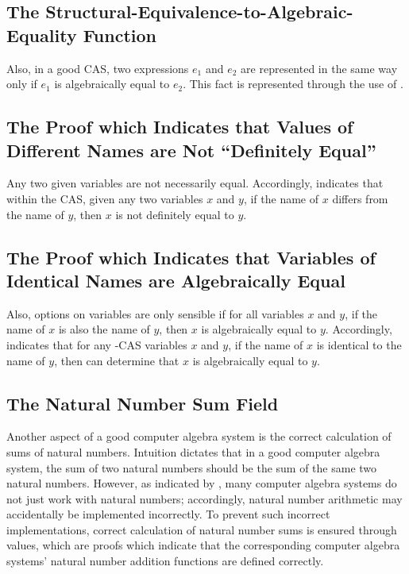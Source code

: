 \documentclass{report}
\begin{document}
\subsection{The Structural-Equivalence-to-Algebraic-Equality Function}
Also, in a good CAS, two expressions \(e_1\) and \(e_2\) are represented in the same way only if \(e_1\) is algebraically equal to \(e_2\).  This fact is represented through the use of .

\subsection{The Proof which Indicates that Values of Different Names are Not ``Definitely Equal''}
Any two given variables are not necessarily equal.  Accordingly,   indicates that within the  CAS, given any two  variables \(x\) and \(y\), if the name of \(x\) differs from the name of \(y\), then \(x\) is not definitely equal to \(y\).

\subsection{The Proof which Indicates that Variables of Identical Names are Algebraically Equal}
Also, options on variables are only sensible if for all variables \(x\) and \(y\), if the name of \(x\) is also the name of \(y\), then \(x\) is algebraically equal to \(y\).  Accordingly,   indicates that for any -CAS variables \(x\) and \(y\), if the name of \(x\) is identical to the name of \(y\), then  can determine that \(x\) is algebraically equal to \(y\).

\subsection{The Natural Number Sum Field}
Another aspect of a good computer algebra system is the correct calculation of sums of natural numbers.  Intuition dictates that in a good computer algebra system, the sum of two natural numbers should be the sum of the same two natural numbers.  However, as indicated by , many computer algebra systems do not just work with natural numbers; accordingly, natural number arithmetic may accidentally be implemented incorrectly.  To prevent such incorrect implementations, correct calculation of natural number sums is ensured through  values, which are proofs which indicate that the corresponding computer algebra systems' natural number addition functions are defined correctly.
\end{document}
